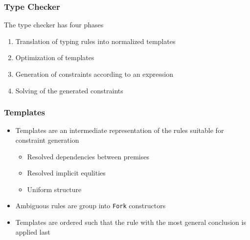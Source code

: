 \documentclass{beamer}
\begin{document}
\begin{frame}
  \frametitle{Type Checker}
  The type checker has four phases
  \begin{enumerate}
  \item Translation of typing rules into normalized templates
  \item Optimization of templates \checkmark{}
  \item Generation of constraints according to an expression
  \item Solving of the generated constraints
  \end{enumerate}
  \vspace{.5cm}
\end{frame}

\begin{frame}
  \frametitle{Templates}
  \begin{itemize}
  \item Templates are an intermediate representation of the rules
    suitable for constraint generation
    \begin{itemize}
    \item Resolved dependencies between premises
    \item Resolved implicit equlities
    \item Uniform structure
    \end{itemize}
  \item Ambiguous rules are group into \texttt{Fork} constructors
  \item Templates are ordered such that the rule with the most general
    conclusion is applied last
  \end{itemize}
\end{frame}
\end{document}
